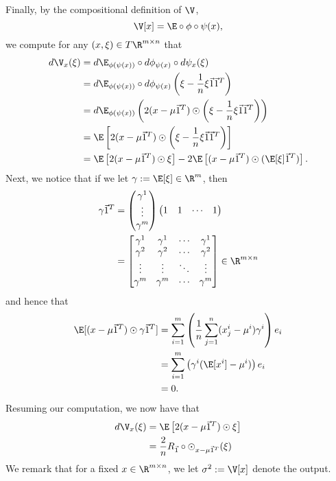 \begin{enumerate}
	  Finally, by the compositional definition of $\V$,
	  $$\V[x]=\E\circ\phi\circ\psi(x),$$
	  we compute for any $(x,\xi)\in T\R^{m\times n}$ that
	  \begin{align*}
	  	d\V_x(\xi)&=d\E_{\phi(\psi(x))}\circ d\phi_{\psi(x)}\circ d\psi_x(\xi)\\
	  	&=d\E_{\phi(\psi(x))}\circ d\phi_{\psi(x)}\left(\xi-\frac{1}{n}\xi\vec{1}\vec{1}^T\right)\\
	  	&=d\E_{\phi(\psi(x))}\left(2(x-\mu\vec{1}^T)\odot\left(\xi-\frac{1}{n}\xi\vec{1}\vec{1}^T\right)\right)\\
	  	&=\E\left[2(x-\mu\vec{1}^T)\odot\left(\xi-\frac{1}{n}\xi\vec{1}\vec{1}^T\right)\right]\\
	  	&=\E\left[2(x-\mu\vec{1}^T)\odot\xi\right]-2\E\left[(x-\mu\vec{1}^T)\odot(\E[\xi]\vec{1}^T)\right].
	  \end{align*}
	  Next, we notice that if we let $\gamma:=\E[\xi]\in\R^m$, then
	  \begin{align*}
	  	\gamma\vec{1}^T&=\begin{pmatrix}
	  		\gamma^1\\
	  		\vdots\\
	  		\gamma^m
	  	\end{pmatrix}\begin{pmatrix}
	  		1&1&\cdots&1
	  	\end{pmatrix}\\
	  	&=\begin{bmatrix}
	  		\gamma^1&\gamma^1&\cdots&\gamma^1\\
	  		\gamma^2&\gamma^2&\cdots&\gamma^2\\
	  		\vdots&\vdots&\ddots&\vdots\\
	  		\gamma^m&\gamma^m&\cdots&\gamma^m
	  	\end{bmatrix}\in\R^{m\times n}
	  \end{align*}
	  and hence that
	  \begin{align*}
	  	\E[(x-\mu\vec{1}^T)\odot\gamma\vec{1}^T]&=\sum_{i=1}^m\left(\frac{1}{n}\sum_{j=1}^n(x^i_j-\mu^i)\gamma^i\right)e_i\\
	  	&=\sum_{i=1}^m\left(\gamma^i(\E[x^i]-\mu^i)\right)e_i\\
	  	&=0.
	  \end{align*}
	  Resuming our computation, we now have that
	  \begin{align*}
	  	d\V_x(\xi)&=\E\left[2(x-\mu\vec{1}^T)\odot\xi\right]\\
	  	&=\frac{2}{n}R_{\vec{1}}\circ\odot_{x-\mu\vec{1}^T}(\xi)
	  \end{align*}
	  We remark that for a fixed $x\in\R^{m\times n}$, we let $\sigma^2:=\V[x]$ denote the output.
\end{enumerate}

